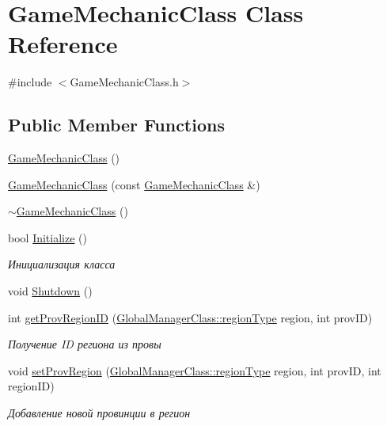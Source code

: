 \hypertarget{class_game_mechanic_class}{}\section{Game\+Mechanic\+Class Class Reference}
\label{class_game_mechanic_class}


{\ttfamily \#include $<$Game\+Mechanic\+Class.\+h$>$}

\subsection*{Public Member Functions}
\begin{DoxyCompactItemize}
\item 
\hyperlink{class_game_mechanic_class_aa6b010bcc72ed952e0a1323d3b0050ef}{Game\+Mechanic\+Class} ()
\item 
\hyperlink{class_game_mechanic_class_a1bd9367c2ac31f0179e718e24a7ea720}{Game\+Mechanic\+Class} (const \hyperlink{class_game_mechanic_class}{Game\+Mechanic\+Class} \&)
\item 
\hyperlink{class_game_mechanic_class_a980e489d5e6d43f8c61b1a3192f8e5fc}{$\sim$\+Game\+Mechanic\+Class} ()
\item 
bool \hyperlink{class_game_mechanic_class_a2a9ae77650f75f710d0c28f429bef538}{Initialize} ()
\begin{DoxyCompactList}\small\item\em Инициализация класса \end{DoxyCompactList}\item 
void \hyperlink{class_game_mechanic_class_a8bfc809e7f8b95478b4f287667f69c05}{Shutdown} ()
\item 
int \hyperlink{class_game_mechanic_class_a853cd7d06f50d4cfd38d4c1d3214011b}{get\+Prov\+Region\+ID} (\hyperlink{class_global_manager_class_a794b4a5298c61f8d25d9da44b7826857}{Global\+Manager\+Class\+::region\+Type} region, int prov\+ID)
\begin{DoxyCompactList}\small\item\em Получение ID региона из провы \end{DoxyCompactList}\item 
void \hyperlink{class_game_mechanic_class_a1bb457c34d4cb7ca53589f99c8a2a540}{set\+Prov\+Region} (\hyperlink{class_global_manager_class_a794b4a5298c61f8d25d9da44b7826857}{Global\+Manager\+Class\+::region\+Type} region, int prov\+ID, int region\+ID)
\begin{DoxyCompactList}\small\item\em Добавление новой провинции в регион \end{DoxyCompactList}\end{DoxyCompactItemize}


